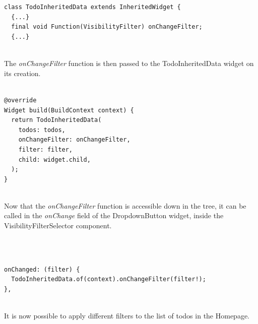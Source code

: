 \mbox{}\\
\begin{code}
\mbox{}\\
\begin{verbatim}
class TodoInheritedData extends InheritedWidget {
  {...}
  final void Function(VisibilityFilter) onChangeFilter;
  {...}
\end{verbatim}
\end{code}
\mbox{}\\
The \textit{onChangeFilter} function is then passed to the TodoInheritedData widget on its creation.
 \mbox{}\\
\mbox{}\\
\begin{code}
\begin{verbatim}
@override
Widget build(BuildContext context) {
  return TodoInheritedData(
    todos: todos,
    onChangeFilter: onChangeFilter,
    filter: filter,
    child: widget.child,
  );
}

\end{verbatim}
\end{code}
 \mbox{}\\
Now that the \textit{onChangeFilter   }function is accessible down in the tree, it can be called in the \textit{onChange }field of the DropdownButton widget, inside the VisibilityFilterSelector component.

\mbox{}\\
\mbox{}\\
\begin{code}

\begin{verbatim}
onChanged: (filter) {
  TodoInheritedData.of(context).onChangeFilter(filter!);
},
\end{verbatim}
\end{code}
\mbox{}\\

It is now possible to apply different filters to the list of todos in the Homepage. 


